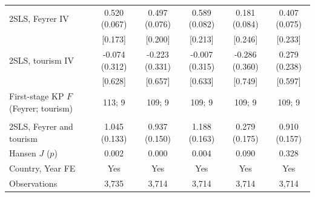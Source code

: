 \begin{tabular}{lccccc}
2SLS, Feyrer IV & 0.520\sym{***} (0.067) & 0.497\sym{***} (0.076) & 0.589\sym{***} (0.082) & 0.181\sym{**} (0.084) & 0.407\sym{***} (0.075) \\
 & [0.173]\sym{***} & [0.200]\sym{**} & [0.213]\sym{***} & [0.246] & [0.233]\sym{*} \\
2SLS, tourism IV & -0.074 (0.312) & -0.223 (0.331) & -0.007 (0.315) & -0.286 (0.360) & 0.279 (0.238) \\
 & [0.628] & [0.657] & [0.633] & [0.749] & [0.597] \\
First-stage KP $F$ (Feyrer; tourism) & 113; 9 & 109; 9 & 109; 9 & 109; 9 & 109; 9 \\
\addlinespace
\multicolumn{6}{l}{\emph{Panel D. Both instruments, $\ln\mathrm{GACI}_{max}$ (over-identified)}}\\
2SLS, Feyrer and tourism & 1.045\sym{***} (0.133) & 0.937\sym{***} (0.150) & 1.188\sym{***} (0.163) & 0.279 (0.175) & 0.910\sym{***} (0.157) \\
Hansen $J$ ($p$) & 0.002 & 0.000 & 0.004 & 0.090 & 0.328 \\
\midrule
Country, Year FE & Yes & Yes & Yes & Yes & Yes \\
Observations & 3,735 & 3,714 & 3,714 & 3,714 & 3,714 \\
\bottomrule
\end{tabular}